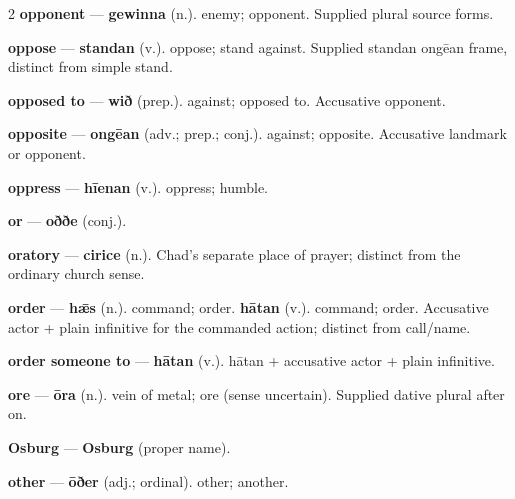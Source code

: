 \begin{multicols}{2}
\textbf{opponent} — \textbf{gewinna} (n.). enemy; opponent. Supplied plural source forms.\par
\textbf{oppose} — \textbf{standan} (v.). oppose; stand against. Supplied standan ongēan frame, distinct from simple stand.\par
\textbf{opposed to} — \textbf{wið} (prep.). against; opposed to. Accusative opponent.\par
\textbf{opposite} — \textbf{ongēan} (adv.; prep.; conj.). against; opposite. Accusative landmark or opponent.\par
\textbf{oppress} — \textbf{hīenan} (v.). oppress; humble.\par
\textbf{or} — \textbf{oððe} (conj.).\par
\textbf{oratory} — \textbf{cirice} (n.). Chad's separate place of prayer; distinct from the ordinary church sense.\par
\textbf{order} — \textbf{hǣs} (n.). command; order. \textbf{hātan} (v.). command; order. Accusative actor + plain infinitive for the commanded action; distinct from call/name.\par
\textbf{order someone to} — \textbf{hātan} (v.). hātan + accusative actor + plain infinitive.\par
\textbf{ore} — \textbf{ōra} (n.). vein of metal; ore (sense uncertain). Supplied dative plural after on.\par
\textbf{Osburg} — \textbf{Osburg} (proper name).\par
\textbf{other} — \textbf{ōðer} (adj.; ordinal). other; another.\par

\end{multicols}

